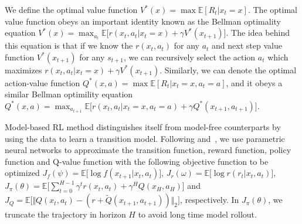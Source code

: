 \documentclass{article} %
\begin{document}
 We define the optimal value function {\small $V^{*}(x) = \max \mathbb{E}[R_t| x_t=x]$}. The optimal value function obeys an important identity known as the Bellman optimality equation $V^{*}(x) = \max_{a_t} \mathbb{E}\Big[r(x_t, a_t|x_t=x) + \gamma V^{*}(x_{t+1})\Big]$. The idea behind this equation is that if we know the $r(x_t, a_t)$ for any $a_t$ and next step value function $ V^{*}(x_{t+1})$ for any $s_{t+1}$, we can recursively select the action $a_t$ which maximizes $r(x_t, a_t|x_t=x) + \gamma V^{*}(x_{t+1})$. Similarly, we can denote the optimal action-value function $Q^*(x, a) = \max \mathbb{E}[R_t|x_t=x, a_t=a]$, and it obeys a similar Bellman optimility equation {\small $Q^*(x,a)=\max_{a_{t+1}} \mathbb{E}\Big[r(x_t, a_t|x_t=x, a_t=a) + \gamma Q^{*}(x_{t+1}, a_{t+1}) \Big]$}.


 Model-based RL method distinguishes itself from model-free counterparts by using the data  to learn a transition model.  Following \cite{janner2019trust} and~\cite{clavera_model-augmented_2019}, we use parametric neural networks to approximate the transition function, reward function, policy function and Q-value function with the following objective function to be optimized
$J_f(\psi) = \mathbb{E}\big[\log f(x_{t+1}|x_t,a_t) \big]$,
 $J_r(\omega) = \mathbb{E}\big[\log r(r_t|x_t,a_t) \big]$,
 $J_\pi(\theta) = \mathbb{E}\big[ \sum_{t=0}^{H-1} \gamma^t r(x_t, a_t) + \gamma^H Q(x_H, a_H) \big]$ and
 $J_Q = \mathbb{E}\big [ \Vert Q(x_t, a_t)  - (r+\tilde{Q}(x_{t+1},a_{t+1} ))\Vert_2\big] $, respectively. In $J_\pi(\theta)$, we truncate the trajectory in horizon $H$ to avoid long time model rollout. 

\end{document}
